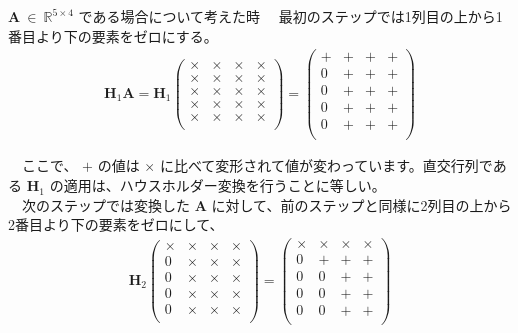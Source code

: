 \documentclass[dvipdfmx,10pt,presentation]{beamer}
\begin{document}
\begin{frame}[allowframebreaks]{\(\bm{A}\ \in\ \mathbb{R}^{5\times4}\) である場合について考えた時}
　最初のステップでは1列目の上から1番目より下の要素をゼロにする。\\

\begin{align*}
\bm{H}_1\bm{A} = \bm{H}_1
\begin{pmatrix}
\times & \times & \times & \times \\
\times & \times & \times & \times \\
\times & \times & \times & \times \\
\times & \times & \times & \times \\
\times & \times & \times & \times \\
\end{pmatrix}
=
\begin{pmatrix}
+ & + & + & + \\
0 & + & + & + \\
0 & + & + & + \\
0 & + & + & + \\
0 & + & + & + \\
\end{pmatrix}
\end{align*}

　ここで、 \(+\) の値は \(\times\) に比べて変形されて値が変わっています。直交行列である \(\bm{H}_1\) の適用は、ハウスホルダー変換を行うことに等しい。\\

　次のステップでは変換した \(\bm{A}\) に対して、前のステップと同様に2列目の上から2番目より下の要素をゼロにして、\\

\begin{align*}
\bm{H}_2
\begin{pmatrix}
\times & \times & \times & \times \\
0 & \times & \times & \times \\
0 & \times & \times & \times \\
0 & \times & \times & \times \\
0 & \times & \times & \times \\
\end{pmatrix}
=
\begin{pmatrix}
\times & \times & \times & \times \\
0 & + & + & + \\
0 & 0 & + & + \\
0 & 0 & + & + \\
0 & 0 & + & + \\
\end{pmatrix}
\end{align*}



\end{frame}
\end{document}

